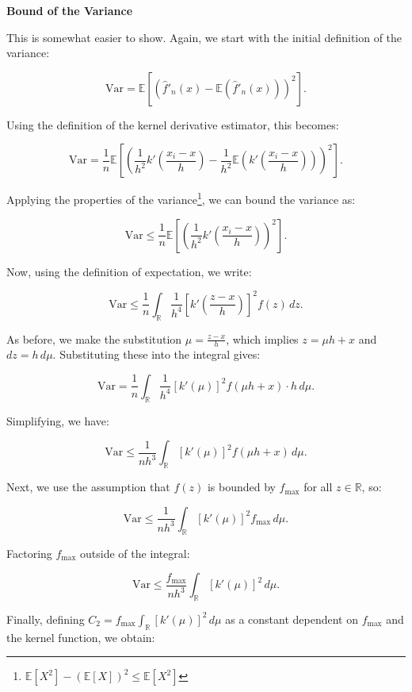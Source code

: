 \documentclass{article}
\begin{document}
\textbf{Bound of the Variance}

This is somewhat easier to show. Again, we start with the initial definition of the variance:

\[
\text{Var} = \mathbb{E}\left[\left(\hat{f}'_n(x) - \mathbb{E}(\hat{f}'_n(x))\right)^2\right].
\]

Using the definition of the kernel derivative estimator, this becomes:

\[
\text{Var} = \frac{1}{n} \mathbb{E}\left[\left(\frac{1}{h^2} k'\left(\frac{x_i - x}{h}\right) - \frac{1}{h^2} \mathbb{E}\left(k'\left(\frac{x_i - x}{h}\right)\right)\right)^2\right].
\]

Applying the properties of the variance\footnote{\(\mathbb{E}[X^2] - (\mathbb{E}[X])^2 \leq \mathbb{E}[X^2]\)}, we can bound the variance as:

\[
\text{Var} \leq \frac{1}{n} \mathbb{E}\left[\left(\frac{1}{h^2} k'\left(\frac{x_i - x}{h}\right)\right)^2\right].
\]

Now, using the definition of expectation, we write:

\[
\text{Var} \leq \frac{1}{n} \int_{\mathbb{R}} \frac{1}{h^4} \left[k'\left(\frac{z - x}{h}\right)\right]^2 f(z) \, dz.
\]

As before, we make the substitution \(\mu = \frac{z - x}{h}\), which implies \(z = \mu h + x\) and \(dz = h \, d\mu\). Substituting these into the integral gives:

\[
\text{Var} = \frac{1}{n} \int_{\mathbb{R}} \frac{1}{h^4} \left[k'(\mu)\right]^2 f(\mu h + x) \cdot h \, d\mu.
\]

Simplifying, we have:

\[
\text{Var} \leq \frac{1}{n h^3} \int_{\mathbb{R}} \left[k'(\mu)\right]^2 f(\mu h + x) \, d\mu.
\]

Next, we use the assumption that \(f(z)\) is bounded by \(f_{\text{max}}\) for all \(z \in \mathbb{R}\), so:

\[
\text{Var} \leq \frac{1}{n h^3} \int_{\mathbb{R}} \left[k'(\mu)\right]^2 f_{\text{max}} \, d\mu.
\]

Factoring \(f_{\text{max}}\) outside of the integral:

\[
\text{Var} \leq \frac{f_{\text{max}}}{n h^3} \int_{\mathbb{R}} \left[k'(\mu)\right]^2 \, d\mu.
\]

Finally, defining \(C_2 = f_{\text{max}} \int_{\mathbb{R}} \left[k'(\mu)\right]^2 \, d\mu\) as a constant dependent on \(f_{\text{max}}\) and the kernel function, we obtain:
\end{document}
